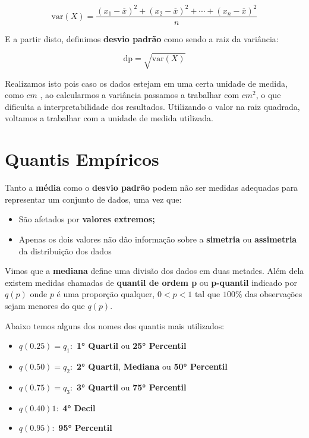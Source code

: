 \documentclass[
]{book}
\begin{document}
\[
\text{var}(X) = \frac{(x_1 - \overline{x})^2 + (x_2 - \overline{x})^2 + \cdots + (x_n - \overline{x})^2}{n}
\]

E a partir disto, definimos \textbf{desvio padrão} como sendo a raiz da variância:

\[
\text{dp} = \sqrt{\text{var}(X)}
\]

Realizamos isto pois caso os dados estejam em uma certa unidade de medida, como \(cm\) , ao calcularmos a variância passamos a trabalhar com \(cm^2\), o que dificulta a interpretabilidade dos resultados. Utilizando o valor na raiz quadrada, voltamos a trabalhar com a unidade de medida utilizada.

\hypertarget{quantis-empuxedricos}{%
\section{Quantis Empíricos}\label{quantis-empuxedricos}}

Tanto a \textbf{média} como o \textbf{desvio padrão} podem não ser medidas adequadas para representar um conjunto de dados, uma vez que:

\begin{itemize}
\item
  São afetados por \textbf{valores extremos;}
\item
  Apenas os dois valores não dão informação sobre a \textbf{simetria} ou \textbf{assimetria} da distribuição dos dados
\end{itemize}

Vimos que a \textbf{mediana} define uma divisão dos dados em duas metades. Além dela existem medidas chamadas de \textbf{quantil de ordem p} ou \textbf{p-quantil} indicado por \(q(p)\) onde \(p\) é uma proporção qualquer, \(0<p<1\) tal que \(100\%\) das observações sejam menores do que \(q(p)\).

Abaixo temos alguns dos nomes dos quantis mais utilizados:

\begin{itemize}
\item
  \(q(0.25) = q_1:\) \textbf{1° Quartil} ou \textbf{25° Percentil}
\item
  \(q(0.50) = q_2:\) \textbf{2° Quartil}, \textbf{Mediana} ou \textbf{50° Percentil}
\item
  \(q(0.75) = q_3:\) \textbf{3° Quartil} ou \textbf{75° Percentil}
\item
  \(q(0.40) 1:\) \textbf{4° Decil}
\item
  \(q(0.95):\) \textbf{95° Percentil}
\end{itemize}
\end{document}

